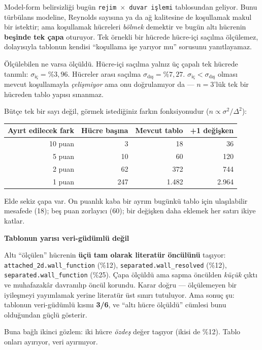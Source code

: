 \documentclass[11pt,a4paper]{article}
\newcommand{\kkkenar}{lacivert}
\newcommand{\kkzemin}{kod}
\newenvironment{renkkutu}[3]{%
  \renewcommand{\kkkenar}{#1}\renewcommand{\kkzemin}{#2}%
  \par\medskip\noindent
  \begin{lrbox}{\kutugovde}%
  \begin{minipage}{\dimexpr\linewidth-2\fboxsep-2\fboxrule\relax}\footnotesize
  \textcolor{#1}{\textbf{#3}}\par\vspace{3pt}%
}{%
  \end{minipage}%
  \end{lrbox}%
  \noindent\fcolorbox{\kkkenar}{\kkzemin}{\usebox{\kutugovde}}%
  \par\medskip
}
\newenvironment{dikkat}[1]{\begin{renkkutu}{orta}{ortabg}{#1}}{\end{renkkutu}}
\begin{document}
Model-form belirsizliği bugün \texttt{rejim $\times$ duvar işlemi}
tablosundan geliyor. Bunu türbülans modeline, Reynolds sayısına ya da ağ
kalitesine de koşullamak makul bir istektir; ama koşullamak hücreleri
\emph{bölmek} demektir ve bugün altı hücrenin \textbf{beşinde tek çapa}
oturuyor. Tek örnekli bir hücrede hücre-içi saçılma ölçülemez, dolayısıyla
tablonun kendisi ``koşullama işe yarıyor mu'' sorusunu yanıtlayamaz.

Ölçülebilen ne varsa ölçüldü. Hücre-içi saçılma yalnız üç çapalı tek hücrede
tanımlı: $\sigma_{\text{iç}} = \%3{,}96$. Hücreler arası saçılma
$\sigma_{\text{dış}} = \%7{,}27$. $\sigma_{\text{iç}} < \sigma_{\text{dış}}$
olması mevcut koşullamayla \emph{çelişmiyor} ama onu doğrulamıyor da ---
$n{=}3$'lük tek bir hücreden tablo yapısı sınanmaz.

Bütçe tek bir sayı değil, görmek istediğiniz farkın fonksiyonudur
($n \propto \sigma^2/\Delta^2$):

\begin{center}\footnotesize
\begin{tabular}{@{}rrrr@{}}
\toprule
Ayırt edilecek fark & Hücre başına & Mevcut tablo & +1 değişken \\
\midrule
10 puan & 3 & 18 & 36 \\
5 puan & 10 & 60 & 120 \\
2 puan & 62 & 372 & 744 \\
1 puan & 247 & 1.482 & 2.964 \\
\bottomrule
\end{tabular}
\end{center}

\noindent Elde sekiz çapa var. On puanlık kaba bir ayrım bugünkü tablo için
ulaşılabilir mesafede (18); beş puan zorlayıcı (60); bir değişken daha eklemek
her satırı ikiye katlar.

\begin{dikkat}{Tablonun yarısı veri-güdümlü değil}
Altı ``ölçülen'' hücrenin \textbf{üçü tam olarak literatür öncülünü} taşıyor:
\texttt{attached\_2d.wall\_function} (\%12), \texttt{separated.wall\_resolved}
(\%12), \texttt{separated.wall\_function} (\%25). Çapa ölçüldü ama sapma
öncülden \emph{küçük} çıktı ve muhafazakâr davranılıp öncül korundu. Karar
doğru --- ölçülemeyen bir iyileşmeyi yayımlamak yerine literatür üst sınırı
tutuluyor. Ama sonuç şu: tablonun veri-güdümlü kısmı \textbf{3/6}, ve
``altı hücre ölçüldü'' cümlesi bunu olduğundan güçlü gösterir.

Buna bağlı ikinci gözlem: iki hücre \emph{özdeş} değer taşıyor (ikisi de
\%12). Tablo onları ayırıyor, veri ayırmıyor.
\end{dikkat}
\end{document}
